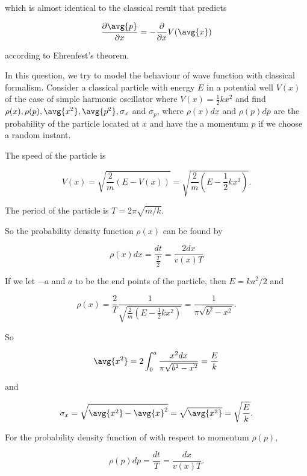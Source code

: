 \documentclass[a4paper,12pt]{report}
\begin{document}
{which is almost identical to the classical result that predicts 

\begin{equation}
  \frac{\partial \avg{p} }{\partial x} = -\frac{\partial }{\partial x} V(\avg{x} ) 
\end{equation}

according to Ehrenfest's theorem.}
	
{In this question, we try to model the behaviour of wave function with classical formalism. Consider a classical particle with energy \(E\) in a potential well \(V(x)\) of the case of simple harmonic oscillator where \(V(x) = \frac12 kx^2\) and find \(\rho(x),\rho(p), \avg{x^2}, \avg{p^2}, \sigma_x\) and \(\sigma_p\), where \(\rho(x)dx\) and \(\rho(p)dp\) are the probability of the particle located at \(x\) and have the a momentum \(p\) if we choose a random instant.}
{The speed of the particle is
	
\begin{equation}
  V(x) = \sqrt{\frac{2}{m} (E - V(x))} = \sqrt{\frac{2}{m} (E - \frac{1}{2} kx^2 )}.  
\end{equation}
		
The period of the particle is  \(T = 2\pi \sqrt{m /k}\).
		
So the probability density function \(\rho(x)\) can be found by
		
\begin{equation}
  \rho (x) dx = \frac{dt}{\frac{T}{2} } = \frac{2dx}{v(x)T}  
\end{equation}
		
If we let \(-a\) and \(a\) to be the end points of the particle, then \(E =  ka^2 /2\) and
		
\begin{equation}
  \rho (x) = \frac{2}{T} \frac{1}{\sqrt{\frac{2}{m} \left(E - \frac{1}{2} kx^2 \right)} } = \frac{1}{\pi \sqrt{b^2 -x^2 } }.  
\end{equation}

So 
		
\begin{equation}
  \avg{x^2 } = 2\int_{0}^{a} \frac{x^2 dx}{\pi \sqrt{b^2 -x^2 } } =  \frac{E}{k}    
\end{equation}

and 

\begin{equation}
  \sigma _{x} = \sqrt{\avg{x^2 } - \avg{x} ^2  } = \sqrt{\avg{x^2 } } = \sqrt{\frac{E}{k} }.   
\end{equation}

For the probability density function of with respect to momentum \(\rho(p)\), 

\begin{equation}
  \rho (p)dp = \frac{dt}{T}  = \frac{dx}{v(x)T}.
\end{equation}}
\end{document}
